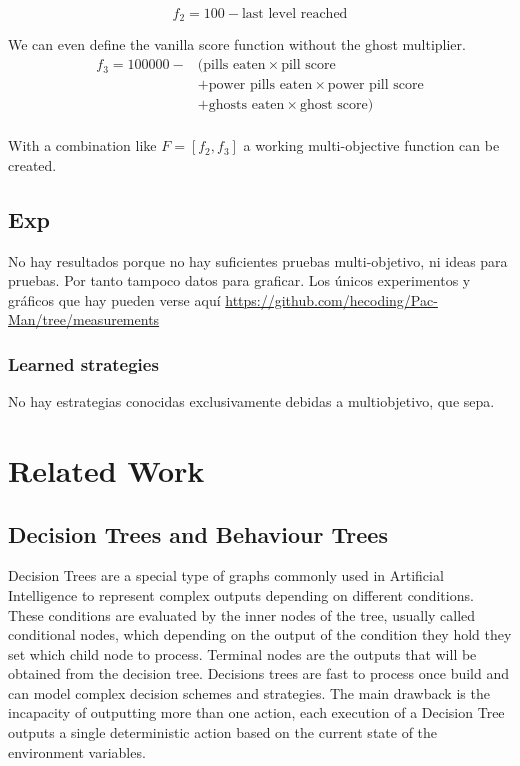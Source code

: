 \documentclass{llncs}
\begin{document}
\begin{equation}
f_2 = 100 - \text{last level reached}
\end{equation}

We can even define the vanilla score function without the ghost multiplier.
\begin{equation}
\begin{split}
f_3 = 100000 - & (\text{pills eaten} \times \text{pill score} \\
& + \text{power pills eaten} \times \text{power pill score} \\
& + \text{ghosts eaten} \times \text{ghost score}) \\
\end{split}
\end{equation}

With a combination like $F = [f_2, f_3]$ a working multi-objective function can be created.

\subsection{Exp}
{\color{red} No hay resultados porque no hay suficientes pruebas multi-objetivo, ni ideas para pruebas. Por tanto tampoco datos para graficar. Los únicos experimentos y gráficos que hay pueden verse aquí \url{https://github.com/hecoding/Pac-Man/tree/measurements}}

\subsubsection{Learned strategies}
{\color{red}No hay estrategias conocidas exclusivamente debidas a multiobjetivo, que sepa.}

%
\section{Related Work}
\label{sec:relatedWork}
%

\subsection{Decision Trees and Behaviour Trees}
Decision Trees are a special type of graphs commonly used in Artificial Intelligence to represent complex outputs depending on different conditions. These conditions are evaluated by the inner nodes of the tree, usually called conditional nodes, which depending on the output of the condition they hold they set which child node to process. Terminal nodes are the outputs that will be obtained from the decision tree. 
Decisions trees are fast to process once build and can model complex decision schemes and strategies. The main drawback is the incapacity of outputting more than one action, each execution of a Decision Tree outputs a single deterministic action based on the current state of the environment variables.
\end{document}
